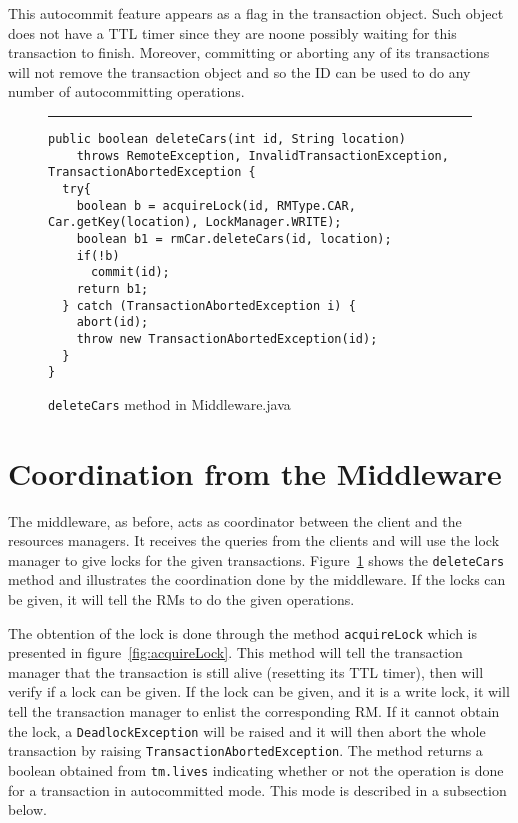 \documentclass[12pt]{article}
\theoremstyle{plain}%
\theoremstyle{definition}
\theoremstyle{remark}
\newcommand{\java}[1]{{\lstinline!#1!}}
\newenvironment{figureone}[1]{%
  \def\deffigurecaption{#1}%
  \begin{figure}[htbp]%
  \begin{center}%
  \begin{minipage}{\columnwidth}%
  \hrule \vspace*{2ex}%
}{%
  \end{minipage}%
  \end{center}%
  \caption{\deffigurecaption}%
  \end{figure}%
}
\begin{document}
This autocommit feature appears as a flag in the transaction object. Such object does not have a TTL timer since they are noone possibly waiting for this transaction to finish. Moreover, committing or aborting any of its transactions will not remove the transaction object and so the ID can be used to do any number of autocommitting operations.  


\begin{figureone}{\java{deleteCars} method in Middleware.java \label{fig:operation}}
\begin{lstlisting}
public boolean deleteCars(int id, String location)
    throws RemoteException, InvalidTransactionException, TransactionAbortedException {
  try{
    boolean b = acquireLock(id, RMType.CAR, Car.getKey(location), LockManager.WRITE);
    boolean b1 = rmCar.deleteCars(id, location);
    if(!b)
      commit(id);
    return b1;
  } catch (TransactionAbortedException i) {
    abort(id);
    throw new TransactionAbortedException(id);
  }
}
\end{lstlisting}
\end{figureone}


\section{Coordination from the Middleware}

The middleware, as before, acts as coordinator between the client and the resources managers. It receives the queries from the clients and will use the lock manager to give locks for the given transactions. Figure~\ref{fig:operation} shows the \java{deleteCars} method and illustrates the coordination done by the middleware. If the locks can be given, it will tell the RMs to do the given operations. 

The obtention of the lock is done through the method \java{acquireLock} which is presented in figure~\ref{fig:acquireLock}. This method will tell the transaction manager that the transaction is still alive (resetting its TTL timer), then will verify if a lock can be given. If the lock can be given, and it is a write lock, it will tell the transaction manager to enlist the corresponding RM. If it cannot obtain the lock, a \java{DeadlockException} will be raised and it will then abort the whole transaction by raising \java{TransactionAbortedException}. The method returns a boolean obtained from \java{tm.lives} indicating whether or not the operation is done for a transaction in autocommitted mode. This mode is described in a subsection below.
\end{document}
